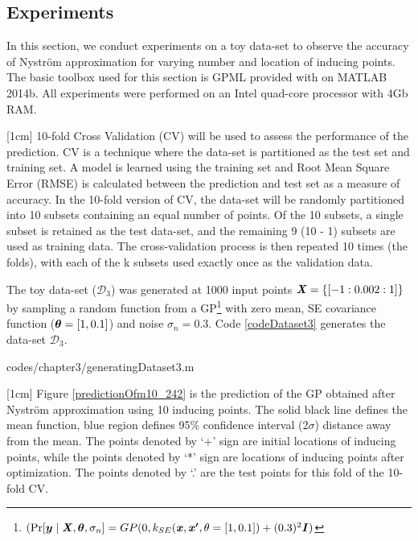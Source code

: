 \subsection{Experiments}\label{subsecNystromExperiments}
In this section, we conduct experiments on a toy data-set to observe the accuracy of Nystr\"{o}m approximation for varying number and location of inducing points. The basic toolbox used for this section is GPML provided with \cite{Rasmussen2005} on MATLAB 2014b. All experiments were performed on an Intel quad-core processor with 4Gb RAM. 

[1cm]
10-fold Cross Validation (CV) will be used to assess the performance of the prediction. CV is a technique where the data-set is partitioned as the test set and training set. A model is learned using the training set and Root Mean Square Error (RMSE) is calculated between the prediction and test set as a measure of accuracy. In the 10-fold version of CV, the data-set will be randomly partitioned into 10 subsets containing an equal number of points. Of the 10 subsets, a single subset is retained as the test data-set, and the remaining 9 (10 - 1) subsets are used as training data. The cross-validation process is then repeated 10 times (the folds), with each of the k subsets used exactly once as the validation data.

The toy data-set ($\mathcal{D}_{3}$) was generated at 1000 input points $\bm{\mathit{X}} = \{[-1:0.002:1]\}$ by sampling a random function from a GP\footnote{$(\Pr[\boldsymbol{y} \mid \bm{\mathit{X}}, \boldsymbol{\theta}, \sigma_{n}] = GP(0, k_{SE}(\bm{\mathit{x}}, \bm{\mathit{x'}}, \theta = [1, 0.1]) + (0.3)^{2}\bm{\mathit{I}})$} with zero mean, SE covariance function ($\boldsymbol{\theta} = [1, 0.1]$) and noise $\sigma_{n} = 0.3$. Code \ref{codeDataset3} generates the data-set $\mathcal{D}_{3}$.

\begin{mdframed}[hidealllines=true,backgroundcolor=lightgray!20]

                    {codes/chapter3/generatingDataset3.m}
\end{mdframed}

[1cm]
Figure \ref{predictionOfm10_242} is the prediction of the GP obtained after Nystr\"{o}m approximation using 10 inducing points. The solid black line defines the mean function, blue region defines 95\% confidence interval (2$\sigma$) distance away from the mean. The points denoted by `+' sign are initial locations of inducing points, while the points denoted by `*' sign are locations of inducing points after optimization. The points denoted by `.' are the test points for this fold of the 10-fold CV. 

